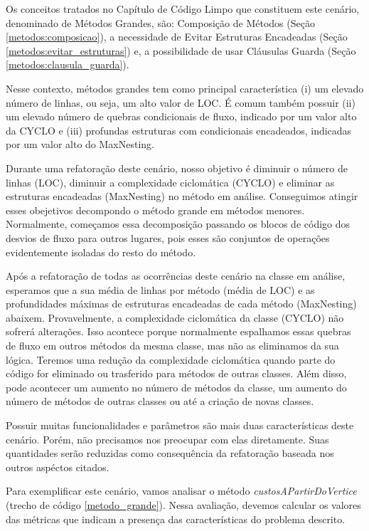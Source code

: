 Os conceitos tratados no Capítulo de Código Limpo que constituem este cenário, denominado de Métodos Grandes, são: Composição de Métodos (Seção \ref{metodos:composicao}), a necessidade de Evitar Estruturas Encadeadas (Seção \ref{metodos:evitar_estruturas}) e, a possibilidade de usar Cláusulas Guarda (Seção \ref{metodos:clausula_guarda}).
	
Nesse contexto, métodos grandes tem como principal característica (i) um elevado número de linhas, ou seja, um alto valor de LOC. É comum também possuir (ii) um elevado número de quebras condicionais de fluxo, indicado por um valor alto da CYCLO e (iii) profundas estruturas com condicionais encadeados, indicadas por um valor alto do MaxNesting.
                                               
Durante uma refatoração deste cenário, nosso objetivo é diminuir o número de linhas (LOC), diminuir a complexidade ciclomática (CYCLO) e eliminar as estruturas encadeadas (MaxNesting) no método em análise. Conseguimos atingir esses obejetivos decompondo o método grande em métodos menores. Normalmente, começamos essa decomposição passando os blocos de código dos desvios de fluxo para outros lugares, pois esses são conjuntos de operações evidentemente isoladas do resto do método.
                                                
Após a refatoração de todas as ocorrências deste cenário na classe em análise, esperamos que a sua média de linhas por método (média de LOC) e as profundidades máximas de estruturas encadeadas de cada método (MaxNesting) abaixem. Provavelmente, a complexidade ciclomática da classe (CYCLO) não sofrerá alterações. Isso acontece porque normalmente espalhamos essas quebras de fluxo em outros métodos da mesma classe, mas não as eliminamos da sua lógica. Teremos uma redução da complexidade ciclomática quando parte do código for eliminado ou trasferido para métodos de outras classes. Além disso, pode acontecer um aumento no número de métodos da classe, um aumento do número de métodos de outras classes ou até a criação de novas classes.

Possuir muitas funcionalidades e parâmetros são mais duas características deste cenário. Porém, não precisamos nos preocupar com elas diretamente. Suas quantidades serão reduzidas como consequência da refatoração baseada nos outros aspéctos citados.

Para exemplificar este cenário, vamos analisar o método \textit{custosAPartirDoVertice} (trecho de código \ref{metodo_grande}). Nessa avaliação, devemos calcular os valores das métricas que indicam a presença das características do problema descrito. 
                                                                                                                         
